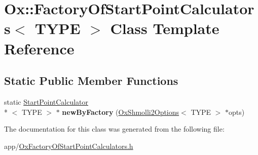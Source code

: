 \hypertarget{class_ox_1_1_factory_of_start_point_calculators}{\section{Ox\-:\-:Factory\-Of\-Start\-Point\-Calculators$<$ T\-Y\-P\-E $>$ Class Template Reference}
\label{class_ox_1_1_factory_of_start_point_calculators}
}
\subsection*{Static Public Member Functions}
\begin{DoxyCompactItemize}
\item 
\hypertarget{class_ox_1_1_factory_of_start_point_calculators_a49529379f7de8796134663b95277cdb0}{static \hyperlink{class_ox_1_1_start_point_calculator}{Start\-Point\-Calculator}\\*
$<$ T\-Y\-P\-E $>$ $\ast$ {\bfseries new\-By\-Factory} (\hyperlink{struct_ox_1_1_ox_shmolli2_options}{Ox\-Shmolli2\-Options}$<$ T\-Y\-P\-E $>$ $\ast$opts)}\label{class_ox_1_1_factory_of_start_point_calculators_a49529379f7de8796134663b95277cdb0}

\end{DoxyCompactItemize}


The documentation for this class was generated from the following file\-:\begin{DoxyCompactItemize}
\item 
app/\hyperlink{_ox_factory_of_start_point_calculators_8h}{Ox\-Factory\-Of\-Start\-Point\-Calculators.\-h}\end{DoxyCompactItemize}
